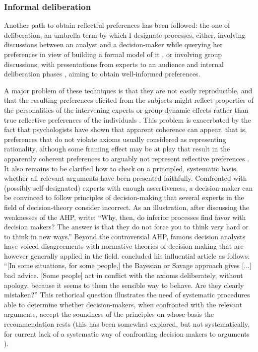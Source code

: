 \documentclass[version=last, pagesize, twoside=off, bibliography=totoc, DIV=calc, fontsize=12pt, a4paper, french, english]{scrartcl}
\begin{document}
\subsubsection{Informal deliberation}
Another path to obtain reflectful preferences has been followed: the one of deliberation, an umbrella term by which I designate processes, either, involving discussions between an analyst and a decision-maker while querying her preferences in view of building a formal model of it \citep{raiffa_back_1985, keeney_decisions_1993, roy_multicriteria_1996, belton_multiple_2002}, or involving group discussions, with presentations from experts to an audience and internal deliberation phases \citep{fishkin_when_2011}, aiming to obtain well-informed preferences. 

A major problem of these techniques is that they are not easily reproducible, and that the resulting preferences elicited from the subjects might reflect properties of the personalities of the intervening experts or group-dynamic effects rather than true reflective preferences of the individuals . This problem is exacerbated by the fact that psychologists have shown that apparent coherence can appear, that is, preferences that do not violate axioms usually considered as representing rationality, although some framing effect may be at play that result in the apparently coherent preferences to arguably not represent reflective preferences \citep{ariely_predictably_2010}. It also remains to be clarified how to check on a principled, systematic basis, whether all relevant arguments have been presented faithfully. Comfronted with (possibly self-designated) experts with enough assertiveness, a decision-maker can be convinced to follow principles of decision-making that several experts in the field of decision-theory consider incorrect. As an illustration, after discussing the weaknesses of the \ac{AHP}, \citet[p.\ 53]{howard_foundations_2007} write: “Why, then, do inferior processes find favor with decision makers? The answer is that they do not force you to think very hard or to think in new ways.”
Beyond the controversial \ac{AHP}, famous decision analysts have voiced disagreements with normative theories of decision making \citep{ellsberg_risk_1961, allais_so-called_1979} that are however generally applied in the field. 
 concluded his influential article as follows: “[In some situations, for some people,] the Bayesian or Savage approach gives [...] bad advice. [Some people] act in conflict with the axioms deliberately, without apology, because it seems to them the sensible way to behave. Are they clearly mistaken?” 
This rethorical question illustrates the need of systematic procedures able to determine whether decision-makers, when confronted with the relevant arguments, accept the soundness of the principles on whose basis the recommendation rests (this has been somewhat explored, but not systematically, for current lack of a systematic way of confronting decision makers to arguments \citep{slovic_who_1974, stanovich_discrepancies_1999}). 
\end{document}
